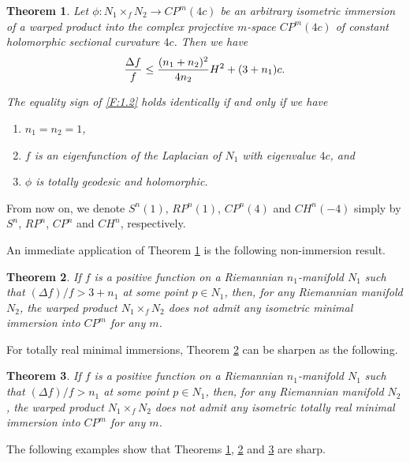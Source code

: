 \documentclass{amsart}
\theoremstyle{plain}
\newtheorem{theorem}{Theorem}[section]
\numberwithin{equation}{section}
\theoremstyle{remark}
\numberwithin{equation}{section}
\begin{document}
\begin{theorem}\label{T:5.5} Let $\phi:N_1\times_f N_2\to CP^m(4c)$ be an arbitrary isometric immersion of a warped product into the complex projective $m$-space $CP^m(4c)$ of constant holomorphic sectional curvature $4c$. Then we have 
\begin{align} \label{F:1.2}{\Delta f\over{f}}\leq {{(n_1+n_2)^2}\over{4n_2}}H^2+ (3+n_1)c.\end{align} 

The equality sign of \eqref{F:1.2} holds identically if and only if  we have 

\begin{enumerate}

\item  $n_1=n_2=1$,  

\item  $f$ is an eigenfunction of the Laplacian of $N_1$ with eigenvalue $4c$, and  

\item $\phi$ is totally geodesic and holomorphic.
\end{enumerate}
\end{theorem}
 
 From now on, we denote $S^{n}(1),\, RP^{n}(1)$, $CP^{n}(4)$ and $ CH^{n}(-4)$ simply  by $S^{n},\, RP^{n}$, $CP^{n}$ and $CH^{n}$, respectively.
 
An immediate  application of Theorem \ref{T:5.5} is the following non-immersion result.

\begin{theorem} \label{T:5.6}  If $f$ is a positive function on a Riemannian $n_1$-manifold $N_1$ such that $(\Delta f)/f>3+n_1$ at some point  $p\in N_1$, then, for any Riemannian manifold $N_2$, the warped product  $N_1\times_f N_2$ does not admit any isometric minimal immersion into  $CP^m$ for any $m$.
\end{theorem}

For totally real minimal immersions, Theorem \ref{T:5.6} can be sharpen as the following.

\begin{theorem} \label{T:5.7}  If $f$ is a positive function on a Riemannian $n_1$-manifold $N_1$ such that $(\Delta f)/f>n_1$ at some point  $p\in N_1$, then, for any Riemannian manifold $N_2$, the warped product  $N_1\times_f N_2$ does not admit any isometric totally real minimal immersion into  $CP^m$ for any $m$.\end{theorem}

The following examples show that Theorems \ref{T:5.5}, \ref{T:5.6} and \ref{T:5.7} are sharp.
\end{document}
